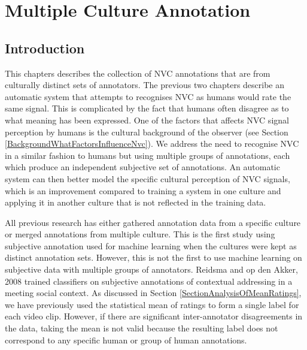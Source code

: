 \chapter[Multiple Culture Annotation]{Multiple Culture Annotation}
\label{ChapterAnnotation}


\section{Introduction}





This chapters describes the collection of \ac{NVC} annotations that are from culturally distinct sets of annotators. The previous two chapters describe an automatic system that attempts to recognises \ac{NVC} as humans would rate the same signal. This is complicated by the fact that humans often disagree as to what meaning has been expressed. One of the factors that affects \ac{NVC} signal perception by humans is the cultural background of the observer (see Section \ref{BackgroundWhatFactorsInfluenceNvc}). We address the need to recognise \ac{NVC} in a similar fashion to humans but using multiple groups of annotations, each which produce an independent subjective set of annotations. An automatic system can then better model the specific cultural perception of \ac{NVC} signals, which is an improvement compared to training a system in one culture and applying it in another culture that is not reflected in the training data.

All previous research has either gathered annotation data from a specific culture or merged annotations from multiple culture. This is the first study using subjective annotation used for machine learning when the cultures were kept as distinct annotation sets. However, this is not the first to use machine learning on subjective data with multiple groups of annotators. Reidsma and op den Akker, 2008 \cite{Reidsma2008b} trained classifiers on subjective annotations of contextual addressing in a meeting social context. As discussed in Section \ref{SectionAnalysisOfMeanRatings}, we have previously used the statistical mean of ratings to form a single label for each video clip. However, if there are significant inter-annotator disagreements in the data, taking the mean is not valid because the resulting label does not correspond to any specific human or group of human annotations.


